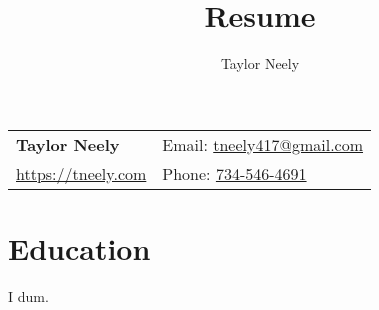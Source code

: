 \documentclass{article}
\title{Resume}
\author{Taylor Neely}
\makeatletter
\newcommand*{\resumeHeader}[4]{%
    \begin{tabular*}{\textwidth}{l@{\extracolsep{\fill}}l}
        \textbf{\large{#1}} & Email: \href{mailto:#2}{#2}\\
        \href{#3}{#3} & Phone: \href{tel:#4}{#4}
    \end{tabular*}
}
\makeatother
\begin{document}
\resumeHeader
    {Taylor Neely}
    {tneely417@gmail.com}
    {https://tneely.com}
    {734-546-4691} %

\section{Education}
I dum.
\end{document}
